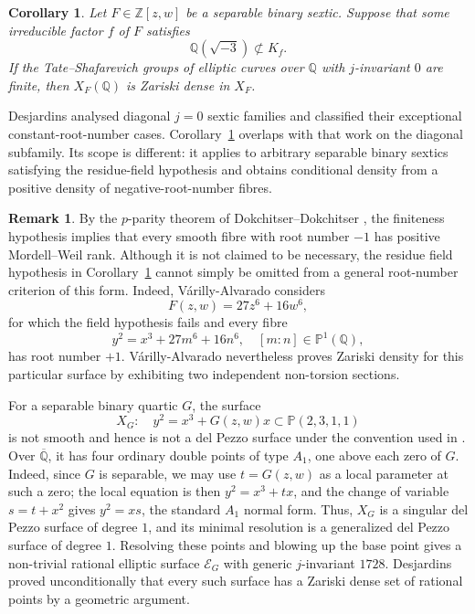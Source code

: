 \documentclass[12pt,reqno]{amsart}
\numberwithin{equation}{section}
\newtheorem{corollary}[theorem]{Corollary}
\theoremstyle{definition}
\newtheorem{remark}[theorem]{Remark}
\newcommand{\PP}{\mathbb{P}}
\newcommand{\ZZ}{\mathbb{Z}}
\newcommand{\QQ}{\mathbb{Q}}
\begin{document}
\begin{corollary}\label{cor:conditional-density-j0}
Let $F\in\ZZ[z,w]$ be a separable binary sextic.
Suppose that some irreducible factor $f$ of $F$ satisfies
\[
\QQ(\sqrt{-3})\not\subset K_f.
\]
If the Tate--Shafarevich groups of elliptic curves over $\QQ$ with $j$-invariant $0$ are finite, then $X_F(\QQ)$ is Zariski dense in $X_F$.
\end{corollary}

Desjardins \cite[Theorem~6.1]{Des} analysed diagonal $j=0$ sextic families and classified their exceptional constant-root-number cases.
Corollary~\ref{cor:conditional-density-j0} overlaps with that work on the diagonal subfamily.
Its scope is different: it applies to arbitrary separable binary sextics satisfying the residue-field hypothesis and obtains conditional density from a positive density of negative-root-number fibres.

\begin{remark}
By the $p$-parity theorem of Dokchitser--Dokchitser \cite{DoDo}, the finiteness hypothesis implies that every smooth fibre with root number $-1$ has positive Mordell--Weil rank.
Although it is not claimed to be necessary, the residue field hypothesis in Corollary~\ref{cor:conditional-density-j0} cannot simply be omitted from a general root-number criterion of this form.
Indeed, V\'arilly-Alvarado \cite[Example~7.1]{VA} considers
\[
F(z,w)=27z^6+16w^6,
\]
for which the field hypothesis fails and every fibre
\[
y^2=x^3+27m^6+16n^6,
\quad [m:n]\in\PP^1(\QQ),
\]
has root number $+1$.
V\'arilly-Alvarado nevertheless proves Zariski density for this particular surface by exhibiting two independent non-torsion sections. 
\end{remark}

\medskip
For a separable binary quartic $G$, the surface
\begin{equation}\label{eq:DP1-family-1728}
X_G:\quad y^2=x^3+G(z,w)x\subset\PP(2,3,1,1)
\end{equation}
is not smooth and hence is not a del Pezzo surface under the convention used in \cite[Section~2B]{VA}.
Over $\overline{\QQ}$, it has four ordinary double points of type $A_1$, one above each zero of $G$.
Indeed, since $G$ is separable, we may use $t=G(z,w)$ as a local parameter at such a zero; the local equation is then $y^2=x^3+tx$, and the change of variable $s=t+x^2$ gives $y^2=xs$, the standard $A_1$ normal form.
Thus, $X_G$ is a singular del Pezzo surface of degree $1$, and its minimal resolution is a generalized del Pezzo surface of degree $1$.
Resolving these points and blowing up the base point gives a non-trivial rational elliptic surface $\mathcal E_G$ with generic $j$-invariant $1728$.
Desjardins \cite[Theorem~5.4]{Des} proved unconditionally that every such surface has a Zariski dense set of rational points by a geometric argument.
\end{document}
